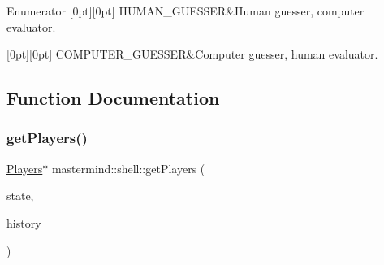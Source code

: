 \begin{DoxyEnumFields}{Enumerator}
[0pt][0pt]{}\hypertarget{namespacemastermind_1_1shell_ad060dfaf42b2c0f7827708f0d0046edeacc5ce9ad68fd8bcf63c6431048467ac2}{}\label{namespacemastermind_1_1shell_ad060dfaf42b2c0f7827708f0d0046edeacc5ce9ad68fd8bcf63c6431048467ac2} 
H\+U\+M\+A\+N\+\_\+\+G\+U\+E\+S\+S\+ER&Human guesser, computer evaluator. \\
\hline

[0pt][0pt]{}\hypertarget{namespacemastermind_1_1shell_ad060dfaf42b2c0f7827708f0d0046edea3853901e4a57fe6d139724873c112ed8}{}\label{namespacemastermind_1_1shell_ad060dfaf42b2c0f7827708f0d0046edea3853901e4a57fe6d139724873c112ed8} 
C\+O\+M\+P\+U\+T\+E\+R\+\_\+\+G\+U\+E\+S\+S\+ER&Computer guesser, human evaluator. \\
\hline

\end{DoxyEnumFields}


\subsection{Function Documentation}
\hypertarget{namespacemastermind_1_1shell_a516fea896c290c75364c483e71389b3d}{}\label{namespacemastermind_1_1shell_a516fea896c290c75364c483e71389b3d} 
\subsubsection{\texorpdfstring{get\+Players()}{getPlayers()}}
{\footnotesize\ttfamily \hyperlink{classmastermind_1_1shell_1_1_players}{Players}$\ast$ mastermind\+::shell\+::get\+Players (\begin{DoxyParamCaption}\item[{\hyperlink{namespacemastermind_1_1shell_ad060dfaf42b2c0f7827708f0d0046ede}{Requested\+State}}]{state,  }\item[{\hyperlink{classmastermind_1_1logic_1_1_game_history}{Game\+History} $\ast$}]{history }\end{DoxyParamCaption})\hspace{0.3cm}{\ttfamily [inline]}}



